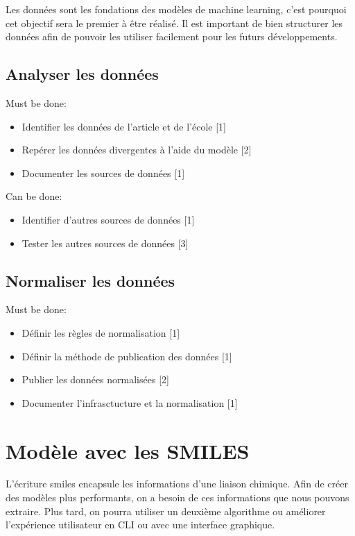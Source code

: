          Les données sont les fondations des modèles de machine learning, c'est pourquoi cet objectif sera le premier à être réalisé. Il est important de bien structurer les données afin de pouvoir les utiliser facilement pour les futurs développements.

      \subsection*{Analyser les données}
         Must be done:
         \begin{itemize}
            \item Identifier les données de l'article et de l'école [1]
            \item Repérer les données divergentes à l'aide du modèle [2]
            \item Documenter les sources de données [1]
         \end{itemize}

         Can be done:
         \begin{itemize}
            \item Identifier d'autres sources de données [1]
            \item Tester les autres sources de données [3]
         \end{itemize}
      \subsection*{Normaliser les données}
         Must be done:
         \begin{itemize}
            \item Définir les règles de normalisation [1]
            \item Définir la méthode de publication des données [1]
            \item Publier les données normalisées [2]
            \item Documenter l'infrasctucture et la normalisation [1]
         \end{itemize}
   
   \section{Modèle avec les SMILES}
   \label{sec:smiles}

            L'écriture \acrshort{smiles} encapsule les informations d'une liaison chimique. Afin de créer des modèles plus performants, on a besoin de ces informations que nous pouvons extraire.
            Plus tard, on pourra utiliser un deuxième algorithme ou améliorer l'expérience utilisateur en CLI ou avec une interface graphique.

